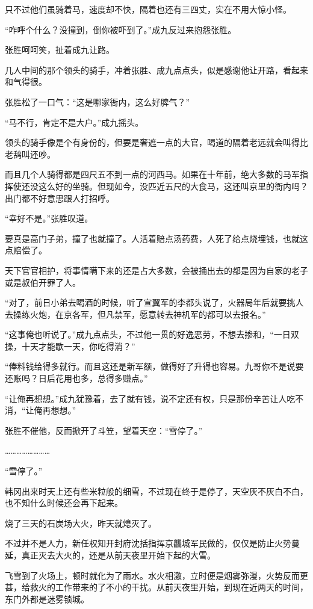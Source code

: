 只不过他们虽骑着马，速度却不快，隔着也还有三四丈，实在不用大惊小怪。

“咋呼个什么？没撞到，倒你被吓到了。”成九反过来抱怨张胜。

张胜呵呵笑，扯着成九让路。

几人中间的那个领头的骑手，冲着张胜、成九点点头，似是感谢他让开路，看起来和气得很。

张胜松了一口气：“这是哪家衙内，这么好脾气？”

“马不行，肯定不是大户。”成九摇头。

领头的骑手像是个有身份的，但要是奢遮一点的大官，喝道的隔着老远就会叫得比老鸹叫还吵。

而且几个人骑得都是四尺五不到一点的河西马。如果在十年前，绝大多数的马军指挥使还没这么好的坐骑。但现如今，没匹近五尺的大食马，这还叫京里的衙内吗？出门都不好意思跟人打招呼。

“幸好不是。”张胜叹道。

要真是高门子弟，撞了也就撞了。人活着赔点汤药费，人死了给点烧埋钱，也就这点赔偿了。

天下官官相护，将事情瞒下来的还是占大多数，会被捅出去的都是因为自家的老子或是叔伯开罪了人。

“对了，前日小弟去喝酒的时候，听了宣翼军的李都头说了，火器局年后就要挑人去操练火炮，在京各军，但凡禁军，愿意转去神机军的都可以去报名。”

“这事俺也听说了。”成九点点头，不过他一贯的好逸恶劳，不想去掺和，“一日双操，十天才能歇一天，你吃得消？”

“俸料钱给得多就行。而且这还是新军额，做得好了升得也容易。九哥你不是说要还账吗？日后花用也多，总得多赚点。”

“让俺再想想。”成九犹豫着，去了就有钱，说不定还有权，只是那份辛苦让人吃不消，“让俺再想想。”

张胜不催他，反而掀开了斗笠，望着天空：“雪停了。”

……………………

“雪停了。”

韩冈出来时天上还有些米粒般的细雪，不过现在终于是停了，天空灰不灰白不白，也不知什么时候还会再下起来。

烧了三天的石炭场大火，昨天就熄灭了。

不过并不是人力，新任权知开封府沈括指挥京龘城军民做的，仅仅是防止火势蔓延，真正灭去大火的，还是从前天夜里开始下起的大雪。

飞雪到了火场上，顿时就化为了雨水。水火相激，立时便是烟雾弥漫，火势反而更甚，给救火的工作带来的了不小的干扰。从前天夜里开始，到现在近两天的时间，东门外都是迷雾锁城。

